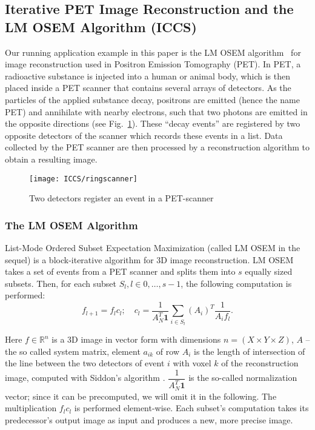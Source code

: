 \subsection{Iterative PET Image Reconstruction and the LM OSEM Algorithm (ICCS)}
\label{sec:pet}
Our running application example in this paper is the LM OSEM algorithm~\cite{READER, sgmkswb09} for image reconstruction used in Positron Emission Tomography (PET).
In PET, a radioactive substance is injected into a human or animal body, which is then placed inside a PET scanner that contains several arrays of detectors.
As the particles of the applied substance decay, positrons are emitted (hence the name PET) and annihilate with nearby electrons, such that two photons are emitted in the opposite directions (see Fig.~\ref{fig:scanner and detector}).
These ``decay events'' are registered by two opposite detectors of the scanner which records these events in a list.
Data collected by the PET scanner are then processed by a reconstruction algorithm to obtain a resulting image.

\begin{figure}
\centering
\texttt{[image: ICCS/ringscanner]}
\caption{Two detectors register an event in a PET-scanner}
\label{fig:scanner and detector}
\end{figure}

\subsubsection{The LM OSEM Algorithm}
List-Mode Ordered Subset Expectation Maximization \cite{READER} (called LM OSEM in the sequel) is a block-iterative algorithm for 3D image reconstruction.
LM OSEM takes a set of events from a PET scanner and splits them into $s$ equally sized subsets.
Then, for each subset $S_l, l \in {0, \ldots, s-1}$, the following computation is performed:
\begin{equation}
f_{l+1}=f_{l}c_{l};\quad
c_{l}=\dfrac{1}{A_N^T \textbf{1}}
\sum_{i \in S_{l}} (A_i)^T \dfrac{1}{A_{i} f_{l}}.
\label{equ:lm_osem}
\end{equation}

Here $f \in \mathbb{R}^n$ is a 3D image in vector form with dimensions $n = (X \times Y \times Z)$, $A$ -- the so called system matrix, element $a_{ik}$ of row $A_i$ is the length of intersection of the line between the two detectors of event $i$ with voxel $k$ of the reconstruction image, computed with Siddon's algorithm \cite{SIDDON}.
$\dfrac{1}{A_N^T \textbf{1}}$ is the so-called normalization vector; since it can be precomputed, we will omit it in the following.
The multiplication $f_{l}c_{l}$ is performed element-wise.
Each subset's computation takes its predecessor's output image as input and produces a new, more precise image.

